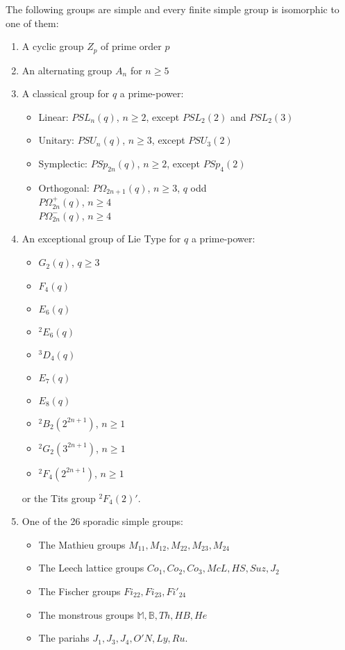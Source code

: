 \documentclass[a4paper]{article}
\begin{document}
\begin{theorem}
The following groups are simple and every finite simple group is isomorphic to one of them:
\begin{enumerate}
	\item
	A cyclic group $Z_p$ of prime order $p$
	\item
	An alternating group $A_n$ for $n \ge 5$
	\item
	A classical group for $q$ a prime-power:
	\begin{itemize}
		\item
		Linear: $PSL_n(q)$, $n \ge 2$, except $PSL_2(2)$ and $PSL_2(3)$
		\item
		Unitary: $PSU_n(q)$, $n \ge 3$, except $PSU_3(2)$
		\item
		Symplectic: $PSp_{2n}(q)$, $n \ge 2$, except $PSp_4(2)$
		\item
		Orthogonal: $P\Omega_{2n+1}(q)$, $n \ge 3$, $q$ odd\\
		$P\Omega^+_{2n}(q)$, $n \ge 4$\\
		$P\Omega^-_{2n}(q)$, $n \ge 4$
	\end{itemize}
	\item
	An exceptional group of Lie Type for $q$ a prime-power:
	\begin{itemize}
		\item $G_2(q)$, $q \ge 3$
		\item $F_4(q)$
		\item $E_6(q)$
		\item ${}^2E_6(q)$
		\item ${}^3D_4(q)$
		\item $E_7(q)$
		\item $E_8(q)$
		\item ${}^2B_2(2^{2n+1})$, $n \ge 1$
		\item ${}^2G_2(3^{2n+1})$, $n \ge 1$
		\item ${}^2F_4(2^{2n+1})$, $n \ge 1$
	\end{itemize}
	or the Tits group ${}^2F_4(2)'$.
	\item
	One of the 26 sporadic simple groups:
	\begin{itemize}
		\item
		The Mathieu groups $M_{11}, M_{12}, M_{22}, M_{23}, M_{24}$
		\item
		The Leech lattice groups $Co_1, Co_2, Co_3, McL, HS, Suz, J_2$
		\item
		The Fischer groups $Fi_{22}, Fi_{23}, Fi'_{24}$
		\item
		The monstrous groups $\mathbb{M}, \mathbb{B}, Th, HB, He$
		\item
		The pariahs $J_1, J_3, J_4, O'N, Ly, Ru$.
	\end{itemize}
\end{enumerate}
\end{theorem}
\end{document}
